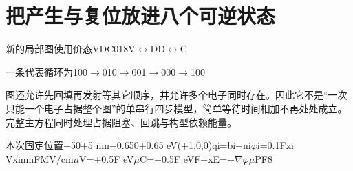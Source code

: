 \section{{\cjkfont 把产生与复位放进八个可逆状态}\allowbreak{}}\label{sec:43}
{\cjkfont 新的局部图使用价态}\allowbreak{}V\allowbreak{}D\allowbreak{}C\allowbreak{}0\allowbreak{}1\allowbreak{}8\allowbreak{}V\ensuremath{\leftrightarrow}D\allowbreak{}D\ensuremath{\leftrightarrow}C\allowbreak{}
\par
{\cjkfont 一条代表循环为}\allowbreak{}100\ensuremath{\to}010\ensuremath{\to}001\ensuremath{\to}000\ensuremath{\to}100\allowbreak{}
\par
{\cjkfont 图还允许先回填再发射等其它顺序，并允许多个电子同时存在。因此它不是“一次只能一个电子占据整个图”的单串行四步模型，简单等待时间相加不再处处成立。完整主方程同时处理占据阻塞、回跳与构型依赖能量。}\allowbreak{}
\par
{\cjkfont 本次固定位置}\allowbreak{}−5\allowbreak{}0\allowbreak{}+5 nm\allowbreak{}−0.65\allowbreak{}0\allowbreak{}+0.65 eV\allowbreak{}(+1,0,0)\allowbreak{}qi=\allowbreak{}bi−ni\allowbreak{}\ensuremath{\varphi}i=\allowbreak{}0.1Fxi V\allowbreak{}xi\allowbreak{}nm\allowbreak{}F\allowbreak{}MV/cm\allowbreak{}\ensuremath{\mu}V=\allowbreak{}+0.5F eV\allowbreak{}\ensuremath{\mu}C=\allowbreak{}−0.5F eV\allowbreak{}F\allowbreak{}+x\allowbreak{}E=\allowbreak{}−\ensuremath{\nabla}\ensuremath{\varphi}\allowbreak{}\ensuremath{\mu}\allowbreak{}PF\allowbreak{}8\allowbreak{}
